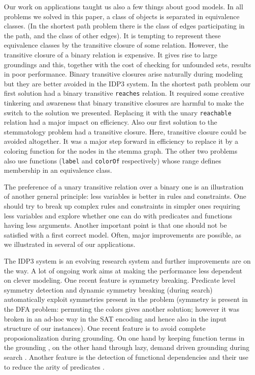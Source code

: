\documentclass{tlp}
\newcommand{\idpdrie}{{\sc IDP3}\xspace}
\renewcommand{\|}{\ensuremath{\,|\,}}
\renewcommand{\|}{\,|\,}
\begin{document}
Our work on applications taught us also a few things about good
models. In all problems we solved in this paper, a class of objects is
separated in equivalence classes. (In the shortest path problem there
is the class of edges participating in the path, and the class of
other edges). It is tempting to represent these equivalence classes by
the transitive closure of some relation. However, the transitive
closure of a binary relation is expensive. It gives rise to large
groundings and this, together with the cost of checking for unfounded
sets, results in poor performance.  Binary transitive closures arise
naturally during modeling but they are better avoided in the IDP3
system. In the shortest path problem our first solution had a binary
transitive \texttt{reaches} relation. It required some creative
tinkering and awareness that binary transitive closures are harmful to
make the switch to the solution we presented.  Replacing it with the
unary \texttt{reachable} relation had a major impact on efficiency.
Also our first solution to the stemmatology problem had a transitive
closure. Here, transitive closure could be avoided altogether. It was
a major step forward in efficiency to replace it by a coloring
function for the nodes in the stemma graph. The other two problems
also use functions (\texttt{label} and \texttt{colorOf} respectively)
whose range defines membership in an equivalence class.

The preference of a unary transitive relation over a binary one is an
illustration of another general principle: less variables is better in
rules and constraints. One should try to break up complex rules and
constraints in simpler ones requiring less variables and explore
whether one can do with predicates and functions having less
arguments. Another important point is that one should not be satisfied
with a first correct model. Often, major improvements are possible, as
we illustrated in several of our applications.

The \idpdrie system is an evolving research system and further
improvements are on the way. A lot of ongoing work aims at making the
performance less dependent on clever modeling. One recent feature is
symmetry breaking. Predicate level symmetry detection and dynamic
symmetry breaking (during search) automatically exploit symmetries
present in the problem \cite{ictai/DevriendtBMDD12} (symmetry is
present in the DFA problem: permuting the colors gives another
solution; however it was broken in an ad-hoc way in the SAT encoding
and hence also in the input structure of our instances). One recent
feature is to avoid complete proposionalization during grounding. On
one hand by keeping function terms in the grounding
\cite{ictai/DeCaTB13}, on the other hand through lazy, demand driven
grounding during search \cite{iclp/DeCatDS12,corr/CatDSB14}. Another
feature is the detection of functional dependencies and their use to
reduce the arity of predicates \cite{tplp/CatB13}.
\end{document}

